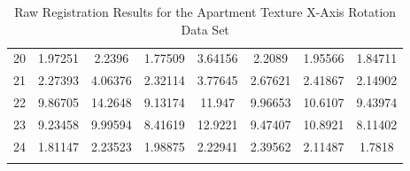 \begin{center}
\begin{longtable}{cccccccc}
20 & 1.97251 & 2.2396 & 1.77509 & 3.64156 & 2.2089 & 1.95566 & 1.84711\\
21 & 2.27393 & 4.06376 & 2.32114 & 3.77645 & 2.67621 & 2.41867 & 2.14902\\
22 & 9.86705 & 14.2648 & 9.13174 & 11.947 & 9.96653 & 10.6107 & 9.43974\\
23 & 9.23458 & 9.99594 & 8.41619 & 12.9221 & 9.47407 & 10.8921 & 8.11402\\
24 & 1.81147 & 2.23523 & 1.98875 & 2.22941 & 2.39562 & 2.11487 & 1.7818\\
\caption{Raw Registration Results for the Apartment Texture X-Axis Rotation Data Set}
\label{tab:apartmenttexturex-axisrotationFULL}
\end{longtable}
\end{center} 



